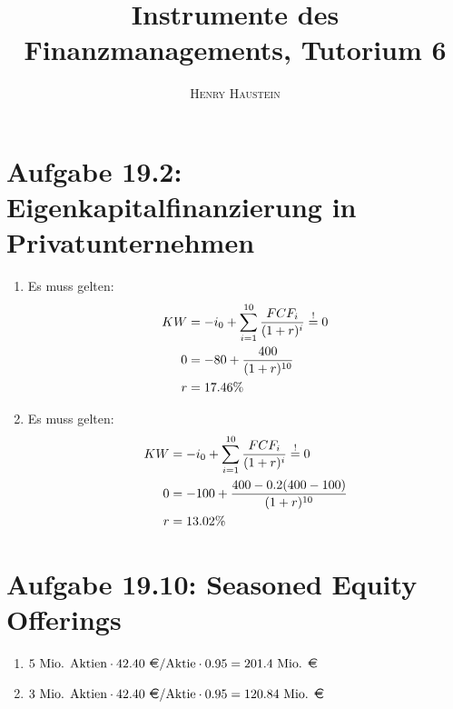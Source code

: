 \documentclass{article}
\title{\textbf{Instrumente des Finanzmanagements, Tutorium 6}}
\author{\textsc{Henry Haustein}}
\date{}
\begin{document}
	\maketitle
	
	\section*{Aufgabe 19.2: Eigenkapitalfinanzierung in Privatunternehmen}
	\begin{enumerate}[label=(\alph*)]
		\item Es muss gelten:
		\begin{align}
			KW &= -i_0 + \sum_{i=1}^{10} \frac{FCF_i}{(1+r)^i} \overset{!}{=} 0 \notag \\
			0 &= -80 + \frac{400}{(1+r)^{10}} \notag \\
			r &= 17.46\% \notag
		\end{align}
		\item Es muss gelten:
		\begin{align}
			KW &= -i_0 + \sum_{i=1}^{10} \frac{FCF_i}{(1+r)^i} \overset{!}{=} 0 \notag \\
			0 &= -100 + \frac{400 - 0.2(400-100)}{(1+r)^{10}} \notag \\
			r &= 13.02\% \notag
		\end{align}
	\end{enumerate}
	
	\section*{Aufgabe 19.10: Seasoned Equity Offerings}
	\begin{enumerate}[label=(\alph*)]
		\item $5\text{ Mio. Aktien}\cdot 42.40\text{ \EUR/Aktie}\cdot 0.95 = 201.4\text{ Mio. \EUR}$
		\item $3\text{ Mio. Aktien}\cdot 42.40\text{ \EUR/Aktie}\cdot 0.95 = 120.84\text{ Mio. \EUR}$
	\end{enumerate}
\end{document}
